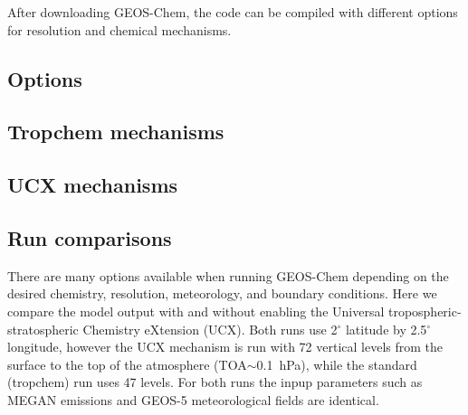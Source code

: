       After downloading GEOS-Chem, the code can be compiled with different options for resolution and chemical mechanisms.
  \subsection{Options}
    
  \subsection{Tropchem mechanisms}
    
  \subsection{UCX mechanisms}
    
  \subsection{Run comparisons}
    
    There are many options available when running GEOS-Chem depending on the desired chemistry, resolution, meteorology, and boundary conditions.
    Here we compare the model output with and without enabling the Universal tropospheric-stratospheric Chemistry eXtension (UCX).
    Both runs use 2$^{\circ}$ latitude by 2.5$^{\circ}$ longitude, however the UCX mechanism is run with 72 vertical levels from the surface to the top of the atmosphere (TOA$\sim$0.1~hPa), while the standard (tropchem) run uses 47 levels.
    For both runs the inpup parameters such as MEGAN emissions and GEOS-5 meteorological fields are identical.
    
